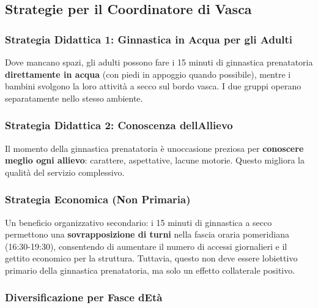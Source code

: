 \documentclass[a4paper,11pt]{article}
\begin{document}
\subsection{Strategie per il Coordinatore di
      Vasca}\label{strategie-per-il-coordinatore-di-vasca}

\subsubsection{Strategia Didattica 1: Ginnastica in Acqua per gli
      Adulti}\label{strategia-didattica-1-ginnastica-in-acqua-per-gli-adulti}

Dove mancano spazi, gli adulti possono fare i 15 minuti di ginnastica
prenatatoria \textbf{direttamente in acqua} (con piedi in appoggio
quando possibile), mentre i bambini svolgono la loro attività a secco
sul bordo vasca. I due gruppi operano separatamente nello stesso
ambiente.

\subsubsection{Strategia Didattica 2: Conoscenza
      dell\textquotesingle Allievo}\label{strategia-didattica-2-conoscenza-dellallievo}

Il momento della ginnastica prenatatoria è un\textquotesingle occasione
preziosa per \textbf{conoscere meglio ogni allievo}: carattere,
aspettative, lacune motorie. Questo migliora la qualità del servizio
complessivo.

\subsubsection{Strategia Economica (Non
      Primaria)}\label{strategia-economica-non-primaria}

Un beneficio organizzativo secondario: i 15 minuti di ginnastica a secco
permettono una \textbf{sovrapposizione di turni} nella fascia oraria
pomeridiana (16:30-19:30), consentendo di aumentare il numero di accessi
giornalieri e il gettito economico per la struttura. Tuttavia, questo
non deve essere l\textquotesingle obiettivo primario della ginnastica
prenatatoria, ma solo un effetto collaterale positivo.

\subsubsection{Diversificazione per Fasce
      d\textquotesingle Età}\label{diversificazione-per-fasce-detuxe0}
\end{document}
